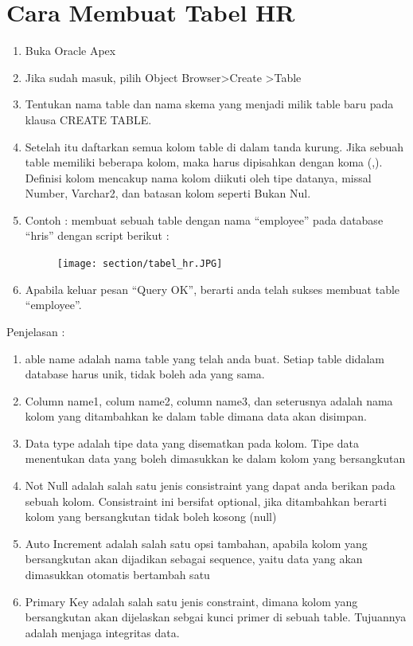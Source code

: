     
\section{Cara Membuat Tabel HR}
\begin{enumerate}
    \item Buka Oracle Apex
    \item Jika sudah masuk, pilih Object Browser>Create >Table
    \item Tentukan nama table dan nama skema yang menjadi milik table baru pada klausa CREATE TABLE.
    \item Setelah itu daftarkan semua kolom table di dalam tanda kurung. Jika sebuah table memiliki beberapa kolom, maka harus dipisahkan dengan koma (,). Definisi kolom mencakup nama kolom diikuti oleh tipe datanya, missal Number, Varchar2, dan batasan kolom seperti Bukan Nul.
    \item Contoh : membuat sebuah table dengan nama “employee” pada database “hris” dengan script berikut :
\begin{figure}[!htbp]
    \centering
    \texttt{[image: section/tabel\_hr.JPG]}
\end{figure}
    \item Apabila keluar pesan “Query OK”, berarti anda telah sukses membuat table “employee”.
    \end{enumerate}

    
Penjelasan :
\begin{enumerate}
    \item able name adalah nama table yang telah anda buat. Setiap table didalam database harus unik, tidak boleh ada yang sama.
    \item Column name1, colum name2, column name3, dan seterusnya adalah nama kolom yang ditambahkan ke dalam table dimana data akan disimpan.
    \item Data type adalah tipe data yang disematkan pada kolom. Tipe data menentukan data yang boleh dimasukkan ke dalam kolom yang bersangkutan
    \item Not Null adalah salah satu jenis consistraint yang dapat anda berikan pada sebuah kolom. Consistraint ini bersifat optional, jika ditambahkan berarti kolom yang bersangkutan tidak boleh kosong (null)
    \item Auto Increment adalah salah satu opsi tambahan, apabila kolom yang bersangkutan akan dijadikan sebagai sequence, yaitu data yang akan dimasukkan otomatis bertambah satu
    \item Primary Key adalah salah satu jenis constraint, dimana kolom yang bersangkutan akan dijelaskan sebgai kunci primer di sebuah table. Tujuannya adalah menjaga integritas data.
\end{enumerate}




